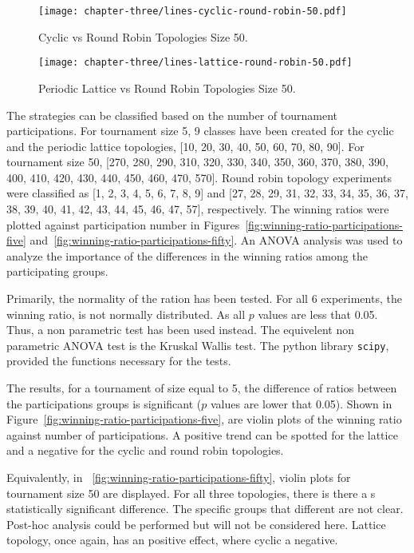 \begin{figure}[H]
	\centering
	\texttt{[image: chapter-three/lines-cyclic-round-robin-50.pdf]}
	\caption{Cyclic vs Round Robin Topologies Size 50.}
	\label{fig:winning-rankings-fifty-c-r}
\end{figure}

\begin{figure}[H]
	\centering
	\texttt{[image: chapter-three/lines-lattice-round-robin-50.pdf]}
	\caption{Periodic Lattice vs Round Robin Topologies Size 50.}
	\label{fig:winning-rankings-fifty-l-r}
\end{figure}

The strategies can be classified based on the number of tournament
participations. For tournament size 5, 9 classes have been created for
the cyclic and the periodic lattice topologies, [10, 20, 30, 40, 50, 60, 70, 80, 90].
For tournament
size 50, [270, 280, 290, 310, 320, 330, 340, 350, 360, 370, 380, 390, 400, 410,
420, 430, 440, 450, 460, 470, 570]. Round robin topology
experiments were classified as [1, 2, 3, 4, 5, 6, 7, 8, 9] and
[27, 28, 29, 31, 32, 33, 34, 35, 36, 37, 38, 39, 40, 41, 42, 43, 44, 45, 46, 47, 57],
respectively. The winning ratios were plotted against participation number
in Figures~\ref{fig:winning-ratio-participations-five} and~\ref{fig:winning-ratio-participations-fifty}.
An ANOVA analysis was used to analyze the importance of the
differences in the winning ratios among the participating groups.

Primarily, the normality of the ration has been tested. For all 6 experiments,
the winning ratio, is not normally distributed. As all \(p\) values are
less that 0.05. Thus, a non parametric test has been used instead. The equivelent
non parametric ANOVA test is the Kruskal Wallis test. The python library
\texttt{scipy}, provided the functions necessary for the tests.

The results, for a tournament of size equal to 5, the difference
of ratios between the participations groups is significant (\(p\) values
are lower that 0.05). Shown in Figure~\ref{fig:winning-ratio-participations-five},
are violin plots of the winning ratio against number of participations.
A positive trend can be spotted for the lattice and a negative for the cyclic
and round robin topologies.

Equivalently, in ~\ref{fig:winning-ratio-participations-fifty}, violin plots for
tournament size 50 are displayed. For all three topologies, there is there  a s
statistically significant difference. The specific groups that different are not
clear. Post-hoc analysis could be performed but will not be considered here.
Lattice topology, once again, has an positive effect, where cyclic a negative.

